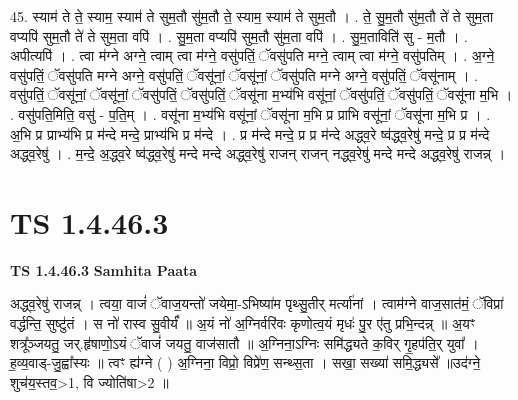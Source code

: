 \documentclass[17pt]{extarticle}
\begin{document}
45. स्याम॑ ते ते॒ स्याम॒ स्याम॑ ते सुम॒तौ सु॑म॒तौ ते॒ स्याम॒ स्याम॑ ते सुम॒तौ । . ते॒ सु॒म॒तौ सु॑म॒तौ ते॑ ते सुम॒ता वप्यपि॑ सुम॒तौ ते॑ ते सुम॒ता वपि॑ । . सु॒म॒ता वप्यपि॑ सुम॒तौ सु॑म॒ता वपि॑ । . सु॒म॒ताविति॑ सु - म॒तौ । . अपीत्यपि॑ । . त्वा म॑ग्ने अग्ने॒ त्वाम् त्वा म॑ग्ने॒ वसु॑पतिं॒ ॅवसु॑पति मग्ने॒ त्वाम् त्वा म॑ग्ने॒ वसु॑पतिम् । . अ॒ग्ने॒ वसु॑पतिं॒ ॅवसु॑पति मग्ने अग्ने॒ वसु॑पतिं॒ ॅवसू॑नां॒ ॅवसू॑नां॒ ॅवसु॑पति मग्ने अग्ने॒ वसु॑पतिं॒ ॅवसू॑नाम् । . वसु॑पतिं॒ ॅवसू॑नां॒ ॅवसू॑नां॒ ॅवसु॑पतिं॒ ॅवसु॑पतिं॒ ॅवसू॑ना म॒भ्य॑भि वसू॑नां॒ ॅवसु॑पतिं॒ ॅवसु॑पतिं॒ ॅवसू॑ना म॒भि । . वसु॑पति॒मिति॒ वसु॑ - प॒ति॒म् । . वसू॑ना म॒भ्य॑भि वसू॑नां॒ ॅवसू॑ना म॒भि प्र प्राभि वसू॑नां॒ ॅवसू॑ना म॒भि प्र । . अ॒भि प्र प्राभ्य॑भि प्र म॑न्दे मन्दे॒ प्राभ्य॑भि प्र म॑न्दे । . प्र म॑न्दे मन्दे॒ प्र प्र म॑न्दे अद्ध्व॒रे ष्व॑द्ध्व॒रेषु॑ मन्दे॒ प्र प्र म॑न्दे अद्ध्व॒रेषु॑ । . म॒न्दे॒ अ॒द्ध्व॒रे ष्व॑द्ध्व॒रेषु॑ मन्दे मन्दे अद्ध्व॒रेषु॑ राजन् राजन् नद्ध्व॒रेषु॑ मन्दे मन्दे अद्ध्व॒रेषु॑ राजन्न् । \newline
\pagebreak
{}
\section*{ TS 1.4.46.3 }

\textbf{TS 1.4.46.3 } \newline
\textbf{Samhita Paata} \newline

अद्ध्व॒रेषु॑ राजन्न्  । त्वया॒ वाजं॑ ॅवाज॒यन्तो॑ जयेमा॒-ऽभिष्या॑म पृथ्सु॒तीर् मर्त्या॑नां । त्वाम॑ग्ने वाज॒सात॑मं॒ ॅविप्रा॑ वर्द्धन्ति॒ सुष्टु॑तं । स नो॑ रास्व सु॒वीर्यं᳚ ॥ अ॒यं नो॑ अ॒ग्निर्वरि॑वः कृणोत्व॒यं मृधः॑ पु॒र ए॑तु प्रभि॒न्दन्न्  ॥ अ॒यꣳ शत्रू᳚ञ्जयतु॒ जर्.हृ॑षाणो॒ऽयं ॅवाजं॑ जयतु॒ वाज॑सातौ ॥ अ॒ग्निना॒ऽग्निः समि॑द्ध्यते क॒विर् गृ॒हप॑ति॒र् युवा᳚ । ह॒व्य॒वाड्-जु॒ह्वा᳚स्यः ॥ त्वꣳ ह्य॑ग्ने ( ) अ॒ग्निना॒ विप्रो॒ विप्रे॑ण॒ सन्थ्स॒ता । सखा॒ सख्या॑ समि॒द्ध्यसे᳚ ॥उद॑ग्ने॒ शुच॑य॒स्तव॒>1, वि ज्योति॑षा>2 ॥ \newline
\end{document}
